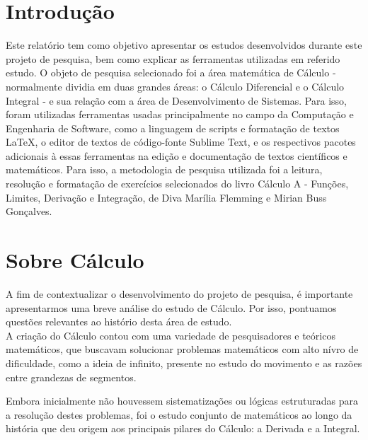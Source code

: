 \documentclass[12 pt, openright, twoside, a4paper, english, french, spanish, brazil]{abntex2}
\begin{document}
\frenchspacing

\imprimircapa
\imprimirfolhaderosto

\textual

\chapter*[Introdução]{Introdução}

Este relatório tem como objetivo apresentar os estudos desenvolvidos durante este projeto de pesquisa, bem como explicar as ferramentas utilizadas em referido estudo. O objeto de pesquisa selecionado foi a área matemática de Cálculo - normalmente dividia em duas grandes áreas: o Cálculo Diferencial e o Cálculo Integral - e sua relação com a área de Desenvolvimento de Sistemas. Para isso, foram utilizadas ferramentas usadas principalmente no campo da Computação e Engenharia de Software, como a linguagem de scripts e formatação de textos \LaTeX, o editor de textos de código-fonte Sublime Text, e os respectivos pacotes adicionais à essas ferramentas na edição e documentação de textos científicos e matemáticos. Para isso, a metodologia de pesquisa utilizada foi a leitura, resolução e formatação de exercícios selecionados do livro Cálculo A - Funções, Limites, Derivação e Integração, de Diva Marília Flemming e Mirian Buss Gonçalves.

\chapter{Sobre Cálculo}

A fim de contextualizar o desenvolvimento do projeto de pesquisa, é importante apresentarmos uma breve análise do estudo de Cálculo. Por isso, pontuamos questões relevantes ao histório desta área de estudo. \\
A criação do Cálculo contou com uma variedade de pesquisadores e teóricos matemáticos, que buscavam solucionar problemas matemáticos com alto nívro de dificuldade, como a ideia de infinito, presente no estudo do movimento e as razões entre grandezas de segmentos.

Embora inicialmente não houvessem sistematizações ou lógicas estruturadas para a resolução destes problemas, foi o estudo conjunto de matemáticos ao longo da história que deu origem aos principais pilares do Cálculo: a Derivada e a Integral. 
\end{document}
